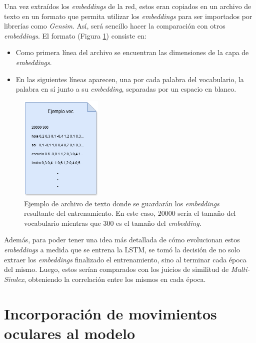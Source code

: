 Una vez extraídos los \textit{embeddings} de la red, estos eran copiados en un archivo de texto en un formato que permita utilizar los \textit{embeddings} para ser importados por librerías como \textit{Gensim}. Así, será sencillo hacer la comparación con otros \textit{embeddings}. El formato (Figura \ref{fig:archivo_embedding}) consiste en:

\begin{itemize}
    \item Como primera línea del archivo se encuentran las dimensiones de la capa de \textit{embeddings}.
    \item En las siguientes líneas aparecen, una por cada palabra del vocabulario, la palabra en sí junto a su \textit{embedding}, separadas por un espacio en blanco.
\end{itemize}

\begin{figure}[htb]
    \centering
    \includegraphics[width=0.35\textwidth]{imagenes/archivo.png}
    \caption{Ejemplo de archivo de texto donde se guardarán los \textit{embeddings} resultante del entrenamiento. En este caso, 20000 sería el tamaño del vocabulario mientras que 300 es el tamaño del \textit{embedding}.}
    \label{fig:archivo_embedding}
\end{figure}

Además, para poder tener una idea más detallada de cómo evolucionan estos \textit{embeddings} a medida que se entrena la LSTM, se tomó la decisión de no solo extraer los \textit{embeddings} finalizado el entrenamiento, sino al terminar cada época del mismo. Luego, estos serían comparados con los juicios de similitud de \textit{Multi-Simlex}, obteniendo la correlación entre los mismos en cada época.

\section{Incorporación de movimientos oculares al modelo}


